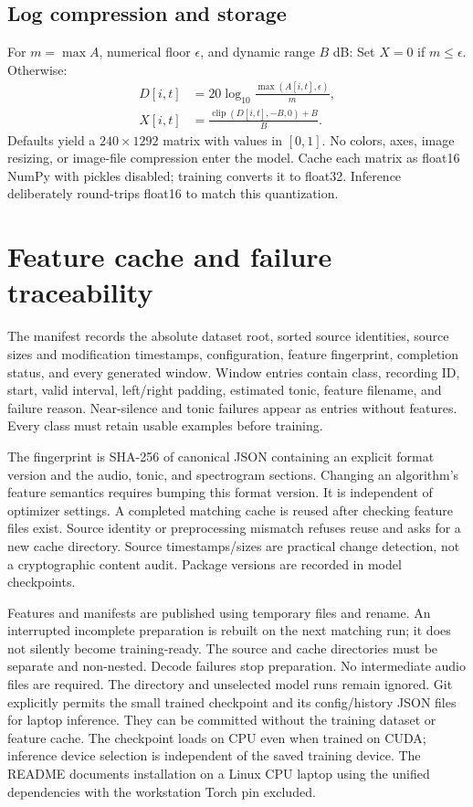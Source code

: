 \documentclass[11pt,a4paper]{article}
\begin{document}
\subsection{Log compression and storage}
For $m=\max A$, numerical floor $\epsilon$, and dynamic range $B$ dB:
Set $X=0$ if $m\le\epsilon$. Otherwise:
\begin{align*}
D[i,t]&=20\log_{10}\frac{\max(A[i,t],\epsilon)}m,\\
X[i,t]&=\frac{\operatorname{clip}(D[i,t],-B,0)+B}{B}.
\end{align*}
Defaults yield a $240\times1292$ matrix with values in $[0,1]$. No colors,
axes, image resizing, or image-file compression enter the model. Cache each
matrix as float16 NumPy with pickles disabled; training converts it to float32.
Inference deliberately round-trips float16 to match this quantization.

\section{Feature cache and failure traceability}
The manifest records the absolute dataset root, sorted source identities, source
sizes and modification timestamps, configuration, feature fingerprint, completion
status, and every generated window. Window entries contain class, recording ID,
start, valid interval, left/right padding, estimated tonic, feature filename,
and failure reason. Near-silence and tonic failures appear as entries without
features. Every class must retain usable examples before training.

The fingerprint is SHA-256 of canonical JSON containing an explicit format version
and the audio, tonic, and spectrogram sections. Changing an algorithm's feature
semantics requires bumping this format version. It is independent of optimizer
settings. A completed matching cache is reused after checking feature files exist.
Source identity or preprocessing mismatch refuses reuse and asks for a new cache
directory. Source timestamps/sizes are practical change detection, not a
cryptographic content audit. Package versions are recorded in model checkpoints.

Features and manifests are published using temporary files and rename. An
interrupted incomplete preparation is rebuilt on the next matching run; it does
not silently become training-ready. The source and cache directories must be
separate and non-nested. Decode failures stop preparation. No intermediate audio
files are required. The  directory and unselected model runs remain
ignored. Git explicitly permits the small trained 
checkpoint and its config/history JSON files for laptop inference. They can be
committed without the training dataset or feature cache. The checkpoint loads on
CPU even when trained on CUDA; inference device selection is independent of the
saved training device. The README documents installation on a Linux CPU laptop
using the unified dependencies with the workstation Torch pin excluded.
\end{document}
